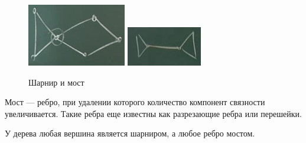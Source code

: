 \begin{figure}
	\begin{center}
		\includegraphics[width=\linewidth]{lection_18/sharnir}
		\includegraphics[width=\linewidth]{lection_18/most}
		\caption{Шарнир и мост}
		\label{Fig:sharnir}
		\vspace{-4cm}
	\end{center}
\end{figure}

Мост --- ребро, при удалении которого количество компонент связности увеличивается. Такие ребра еще известны как разрезающие ребра или перешейки.

У дерева любая вершина является шарниром, а любое ребро мостом.


